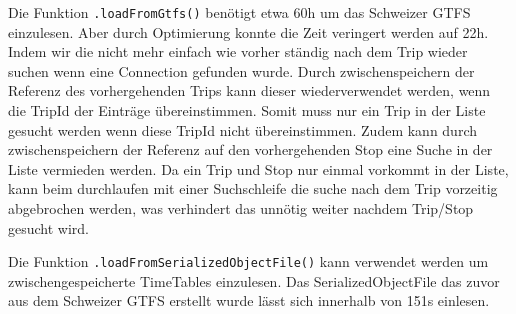 Die Funktion \texttt{.loadFromGtfs()} benötigt etwa 60h um das Schweizer GTFS einzulesen. Aber durch Optimierung konnte die Zeit veringert werden auf 22h. Indem wir die nicht mehr einfach wie vorher ständig nach dem Trip wieder suchen wenn eine Connection gefunden wurde. Durch zwischenspeichern der Referenz des vorhergehenden Trips kann dieser wiederverwendet werden, wenn die TripId der Einträge übereinstimmen. Somit muss nur ein Trip in der Liste gesucht werden wenn diese TripId nicht übereinstimmen. Zudem kann durch zwischenspeichern der Referenz auf den vorhergehenden Stop eine Suche in der Liste vermieden werden. Da ein Trip und Stop nur einmal vorkommt in der Liste, kann beim durchlaufen mit einer Suchschleife die suche nach dem Trip vorzeitig abgebrochen werden, was verhindert das unnötig weiter nachdem Trip/Stop gesucht wird.  

Die Funktion \texttt{.loadFromSerializedObjectFile()} kann verwendet werden um zwischengespeicherte TimeTables einzulesen. Das SerializedObjectFile das zuvor aus dem Schweizer GTFS erstellt wurde lässt sich innerhalb von 151s einlesen.

